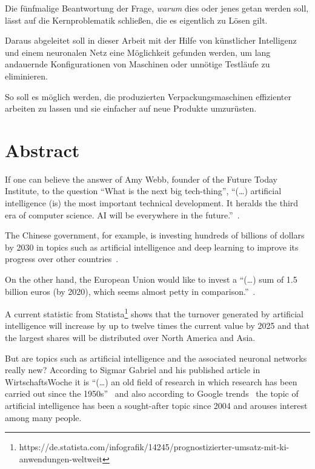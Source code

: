 Die fünfmalige Beantwortung der Frage, \textit{warum} dies oder jenes getan werden soll, lässt auf die Kernproblematik
schließen, die es eigentlich zu Lösen gilt.

Daraus abgeleitet soll in dieser Arbeit mit der Hilfe von künstlicher Intelligenz und einem neuronalen Netz eine
Möglichkeit gefunden werden, um lang andauernde Konfigurationen von Maschinen oder unnötige Testläufe zu eliminieren.

So soll es möglich werden, die produzierten Verpackungsmaschinen effizienter arbeiten zu lassen und sie einfacher auf
neue Produkte umzurüsten.

\newpage

\section{Abstract}
\label{sec:abstract}
If one can believe the answer of Amy Webb, founder of the Future Today Institute, to the question \enquote{What is the
next big tech-thing}, \enquote{(\ldots) artificial intelligence (is) the most important technical development. It
heralds the third era of computer science. AI will be everywhere in the future.}~\cite{article_einleitung_dub_aw}.

The Chinese government, for example, is investing hundreds of billions of dollars by 2030 in topics such as artificial
intelligence and deep learning to improve its progress over other countries~\cite{article_einleitung_css}.

On the other hand, the European Union would like to invest a \enquote{(\ldots) sum of 1.5 billion euros (by 2020),
which seems almost petty in comparison.}~\cite{article_einleitung_ww_sg}.

A current statistic from
Statista\footnote{https://de.statista.com/infografik/14245/prognostizierter-umsatz-mit-ki-anwendungen-weltweit} shows
that the turnover generated by artificial intelligence will increase by up to twelve times the current value by 2025
and that the largest shares will be distributed over North America and Asia.

But are topics such as artificial intelligence and the associated neuronal networks really new? According to Sigmar
Gabriel and his published article in WirtschaftsWoche it is \enquote{(\ldots) an old field of research in which
research has been carried out since the 1950s}~\cite{article_einleitung_ww_sg} and also according to Google
trends~\cite{online_einleitung_googletrends} the topic of artificial intelligence has been a sought-after topic since
2004 and arouses interest among many people.

